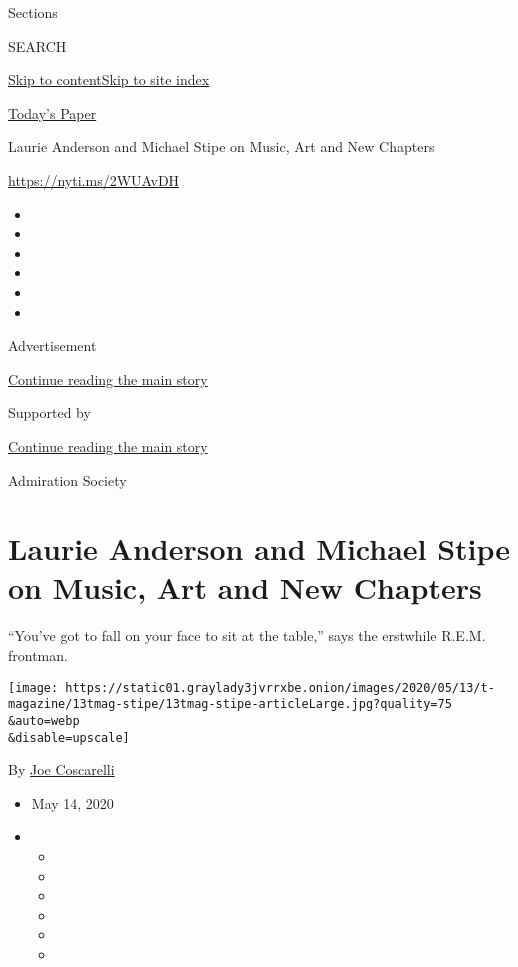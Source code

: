 Sections

SEARCH

\protect\hyperlink{site-content}{Skip to
content}\protect\hyperlink{site-index}{Skip to site index}

\href{https://myaccount.nytimes3xbfgragh.onion/auth/login?response_type=cookie\&client_id=vi}{}

\href{https://www.nytimes3xbfgragh.onion/section/todayspaper}{Today's
Paper}

Laurie Anderson and Michael Stipe on Music, Art and New Chapters

\url{https://nyti.ms/2WUAvDH}

\begin{itemize}
\item
\item
\item
\item
\item
\item
\end{itemize}

Advertisement

\protect\hyperlink{after-top}{Continue reading the main story}

Supported by

\protect\hyperlink{after-sponsor}{Continue reading the main story}

Admiration Society

\hypertarget{laurie-anderson-and-michael-stipe-on-music-art-and-new-chapters}{%
\section{Laurie Anderson and Michael Stipe on Music, Art and New
Chapters}\label{laurie-anderson-and-michael-stipe-on-music-art-and-new-chapters}}

``You've got to fall on your face to sit at the table,'' says the
erstwhile R.E.M. frontman.

\texttt{[image: https://static01.graylady3jvrrxbe.onion/images/2020/05/13/t-magazine/13tmag-stipe/13tmag-stipe-articleLarge.jpg?quality=75\\\&auto=webp\\\&disable=upscale]}

By \href{https://www.nytimes3xbfgragh.onion/by/joe-coscarelli}{Joe
Coscarelli}

\begin{itemize}
\item
  May 14, 2020
\item
  \begin{itemize}
  \item
  \item
  \item
  \item
  \item
  \item
  \end{itemize}
\end{itemize}

